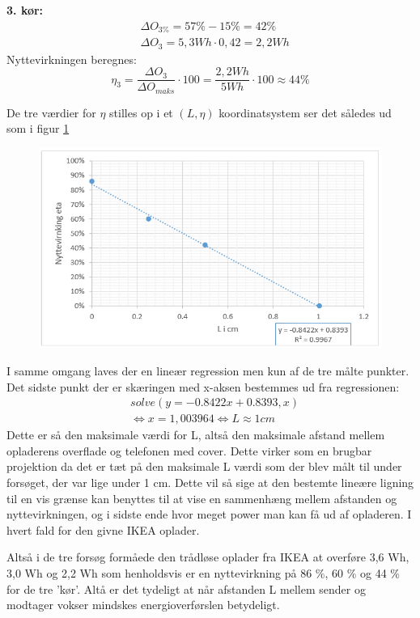 \textbf{3. kør:}
\begin{align*}
& \Delta O_{3\%} = 57\%-15\% =  42\%  \\
& \Delta O_3 = 5,3 Wh \cdot 0,42 = 2,2 Wh
\end{align*}
Nyttevirkningen beregnes:
\begin{equation}
\eta_3 = \frac{\Delta O_3}{\Delta O_{maks}} \cdot 100 = \frac{2,2 Wh}{5 Wh} \cdot 100 \approx 44 \%
\label{eq:nyt3}
\end{equation}

De tre værdier for $\eta$ stilles op i et $(L,\eta)$ koordinatsystem ser det således ud som i figur \ref{figure:graf4}

\begin{figure}[H]
\includegraphics[width=1\textwidth]{Setup/forsg2_graf4}
\caption{}
\label{figure:graf4}
\end{figure}
I samme omgang laves der en lineær regression men kun af de tre målte punkter. Det sidste punkt der er skæringen med x-aksen bestemmes ud fra regressionen:
\begin{align*}
& solve(y=-0.8422x+0.8393,x) \\
& \Leftrightarrow x = 1,003964 \Leftrightarrow L \approx 1 cm
\end{align*} 
Dette er så den maksimale værdi for L, altså den maksimale afstand mellem opladerens overflade og telefonen med cover. Dette virker som en brugbar projektion da det er tæt på den maksimale L værdi som der blev målt til under forsøget, der var lige under 1 cm. Dette vil så sige at den bestemte lineære ligning til en vis grænse kan benyttes til at vise en sammenhæng mellem afstanden og nyttevirkningen, og i sidste ende hvor meget power man kan få ud af opladeren. I hvert fald for den givne IKEA oplader.

Altså i de tre forsøg formåede den trådløse oplader fra IKEA at overføre 3,6 Wh, 3,0 Wh og 2,2 Wh som henholdsvis er en nyttevirkning på 86 \%, 60 \% og 44 \% for de tre 'kør'. Altå er det tydeligt at når afstanden L mellem sender og modtager vokser mindskes energioverførslen betydeligt.
